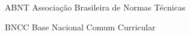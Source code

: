 
\begin{siglas}
    \item[ABNT] Associação Brasileira de Normas Técnicas
    \item[BNCC] Base Nacional Comum Curricular
\end{siglas}
